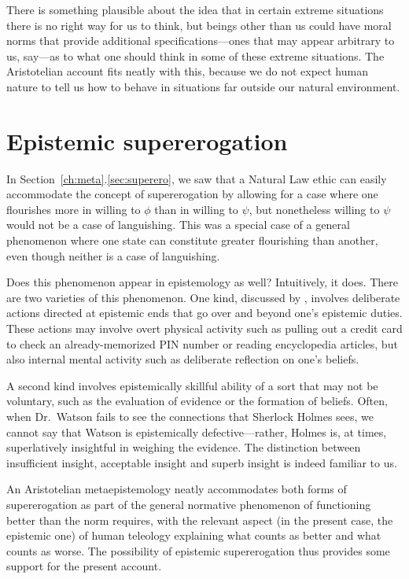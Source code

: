 There is something plausible about the idea that in certain extreme situations there is no right way for us to think,
but beings other than us could have moral norms that provide additional specifications---ones that may appear 
arbitrary to us, say---as to what one should think in some of these extreme situations. The Aristotelian account
fits neatly with this, because we do not expect human nature to tell us how to behave in situations far outside
our natural environment.

\section{Epistemic supererogation}
In Section~\ref{ch:meta}.\ref{sec:superero}, we saw that a Natural Law ethic can easily accommodate the concept of supererogation by allowing for a case
where one flourishes more in willing to $\phi$ than in willing to $\psi$, but nonetheless willing to $\psi$ would not be a case of languishing. This was
a special case of a general phenomenon where one state can constitute greater flourishing than another, even though neither
is a case of languishing. 

Does this phenomenon appear in epistemology as well? Intuitively, it does. 
There are two varieties of this phenomenon. One kind, discussed by , 
involves deliberate actions directed at epistemic ends that go over and beyond one's epistemic
duties. These actions may involve overt physical activity such as pulling out a credit card
to check an already-memorized PIN number or reading encyclopedia articles, but also internal 
mental activity such as deliberate reflection on one's beliefs. 

A second kind involves epistemically skillful ability of a sort that may not be voluntary,
such as the evaluation of evidence or the formation of beliefs. Often, when Dr.~Watson fails to 
see the connections that Sherlock Holmes sees, we cannot say that Watson is epistemically 
defective---rather, Holmes is, at times, superlatively insightful in weighing the evidence. 
The distinction between insufficient insight, acceptable insight and superb insight is indeed 
familiar to us.

An Aristotelian metaepistemology neatly accommodates both forms of supererogation as part of the 
general normative phenomenon of functioning better than the norm requires, with the relevant aspect
(in the present case, the epistemic one) of human teleology explaining what counts as better and 
what counts as worse. The possibility of 
epistemic supererogation thus provides some support for the present account.

